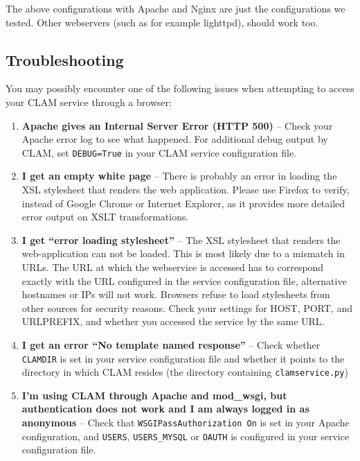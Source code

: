 \documentclass[a4paper,12pt,twoside,openright]{report}
\begin{document}
The above configurations with Apache and Nginx are just the configurations we
tested. Other webservers (such as for example lighttpd), should work too. 

\subsection{Troubleshooting}

You may possibly encounter one of the following issues when attempting to access your CLAM service through a browser:

\begin{enumerate}[leftmargin=5mm]
\item \textbf{Apache gives an Internal Server Error (HTTP 500)} -- Check your Apache error log to see what happened. For additional debug output by CLAM, set \texttt{DEBUG=True} in your CLAM service configuration file. 
\item \textbf{I get an empty white page} -- There is probably an error in loading the XSL stylesheet that renders the web application. Please use Firefox to verify, instead of Google Chrome or Internet Explorer, as it provides more detailed error output on XSLT transformations.
\item \textbf{I get ``error loading stylesheet''} -- The XSL stylesheet that
  renders the web-application can not be loaded. This is most likely due to a
  mismatch in URLs. The URL at which the webservice is accessed has to
  correspond exactly with the URL configured in the service configuration file,
  alternative hostnames or IPs will not work. Browsers refuse to load
  stylesheets from other sources for security reasons. Check your settings for HOST, PORT,  and URLPREFIX, and whether you accessed the service by the same URL.
\item \textbf{I get an error ``No template named response''} -- Check whether
  \texttt{CLAMDIR} is set in your service configuration file and whether it points to the directory in which CLAM resides (the directory containing \texttt{clamservice.py})
\item \textbf{I'm using CLAM through Apache and mod_wsgi, but authentication does
  not work and I am always logged in as anonymous} -- Check that
  \texttt{WSGIPassAuthorization On} is set in your Apache configuration, and
  \texttt{USERS}, \texttt{USERS\_MYSQL} or \texttt{OAUTH} is configured in your service configuration file.

\end{enumerate}
\end{document}
